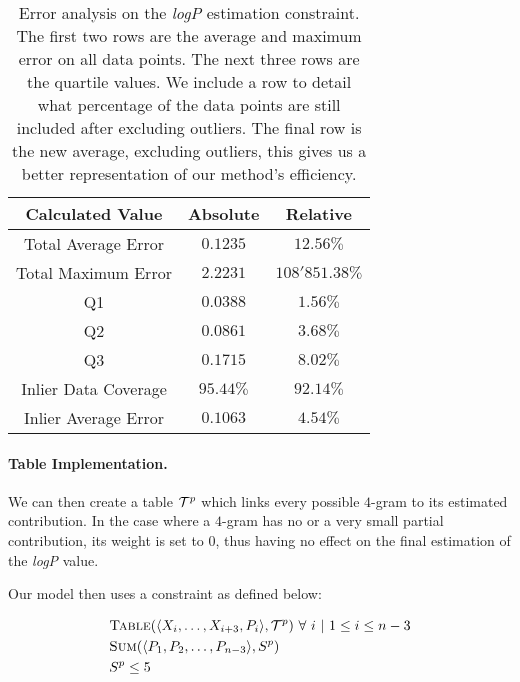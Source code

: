 \documentclass[../Document.tex]{subfiles}
\begin{document}
\begin{table}[H]
    \centering
    \begin{tabular}{|c|c|c|}
        \hline
        \textbf{Calculated Value} & \textbf{Absolute} & \textbf{Relative}\\
        \hline
        Total Average Error & $0.1235$ & $12.56\%$\\
        \hline
        Total Maximum Error & $2.2231$ & $108'851.38\%$\\
        \hline
        Q1 & $0.0388$ & $1.56\%$\\
        \hline
        Q2 & $0.0861$ & $3.68\%$\\
        \hline
        Q3 & $0.1715$ & $8.02\%$\\
        \hline
        Inlier Data Coverage & $95.44\%$ & $92.14\%$\\
        \hline
        Inlier Average Error & $0.1063$ & $4.54\%$\\
        \hline
    \end{tabular}
    \caption[Error analysis on the \emph{logP} estimation constraint]{Error analysis on the \emph{logP} estimation constraint. The first two rows are the average and maximum error on all data points. The next three rows are the quartile values. We include a row to detail what percentage of the data points are still included after excluding outliers. The final row is the new average, excluding outliers, this gives us a better representation of our method's efficiency.}
    \label{tab:lingo-error-analysis}
\end{table}

\paragraph{Table Implementation.}
We can then create a table ${\cal T}^p$ which links every possible $4$-gram to its estimated contribution.
In the case where a $4$-gram has no or a very small partial contribution, its weight is set to 0, thus having no effect on the final estimation of the \emph{logP} value.

Our model then uses a \extensional constraint as defined below:

\begin{align*}
    &\mbox{\sc Table}(\langle X_i,\ldots,X_{i+3},P_i\rangle, {\cal T}^p)\ \forall\ i\ \vert\ 1 \leq i \leq n-3 \\
    &\mbox{\sc Sum}(\langle P_1, P_2,\ldots,P_{n-3} \rangle, S^p)\\
    &S^p \leq 5
\end{align*}
\end{document}
